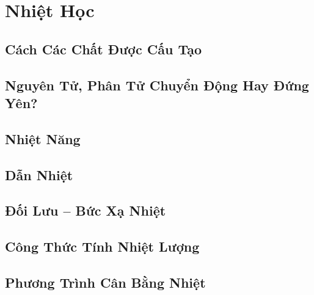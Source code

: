 \documentclass{article}
\numberwithin{equation}{section}
\begin{document}

\section{Nhiệt Học}

\subsection{Cách Các Chất Được Cấu Tạo}


\subsection{Nguyên Tử, Phân Tử Chuyển Động Hay Đứng Yên?}


\subsection{Nhiệt Năng}


\subsection{Dẫn Nhiệt}


\subsection{Đối Lưu -- Bức Xạ Nhiệt}


\subsection{Công Thức Tính Nhiệt Lượng}


\subsection{Phương Trình Cân Bằng Nhiệt}
\end{document}
